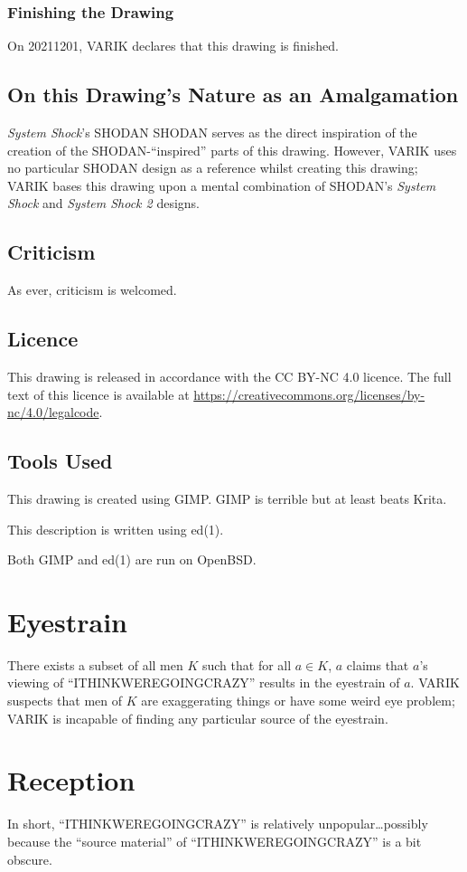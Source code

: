 \documentclass{report}
\begin{document}
\subsubsection{Finishing the Drawing}
On 20211201, VARIK declares that this drawing is finished.
\subsection{On this Drawing's Nature as an Amalgamation}
\textit{System Shock}'s SHODAN SHODAN serves as the direct inspiration of the creation of the SHODAN-``inspired'' parts of this drawing.  However, VARIK uses no particular SHODAN design as a reference whilst creating this drawing; VARIK bases this drawing upon a mental combination of SHODAN's \textit{System Shock} and \textit{System Shock 2} designs.
\subsection{Criticism}
As ever, criticism is welcomed.
\subsection{Licence}
This drawing is released in accordance with the CC BY-NC 4.0 licence.  The full text of this licence is available at \url{https://creativecommons.org/licenses/by-nc/4.0/legalcode}.
\subsection{Tools Used}
This drawing is created using GIMP\@.  GIMP is terrible but at least beats Krita.

This description is written using ed(1).

Both GIMP and ed(1) are run on OpenBSD\@.
\section{Eyestrain}
There exists a subset of all men $K$ such that for all $a \in K$, $a$ claims that $a$'s viewing of ``ITHINKWEREGOINGCRAZY'' results in the eyestrain of $a$.  VARIK suspects that men of $K$ are exaggerating things or have some weird eye problem; VARIK is incapable of finding any particular source of the eyestrain.
\section{Reception}
In short, ``ITHINKWEREGOINGCRAZY'' is relatively unpopular\ldots possibly because the ``source material'' of ``ITHINKWEREGOINGCRAZY'' is a bit obscure.
\end{document}

